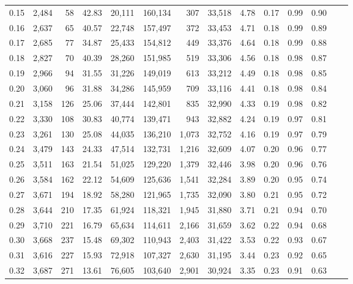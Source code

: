 \begin{tabular}{rrrrrrrrrrrrrr}
0.15 &  2,484 &   58 &   42.83 &   20,111 &  160,134 &     307 &  33,518 &  4.78 &  0.17 &  0.99 &      0.90 \\
0.16 &  2,637 &   65 &   40.57 &   22,748 &  157,497 &     372 &  33,453 &  4.71 &  0.18 &  0.99 &      0.89 \\
0.17 &  2,685 &   77 &   34.87 &   25,433 &  154,812 &     449 &  33,376 &  4.64 &  0.18 &  0.99 &      0.88 \\
0.18 &  2,827 &   70 &   40.39 &   28,260 &  151,985 &     519 &  33,306 &  4.56 &  0.18 &  0.98 &      0.87 \\
0.19 &  2,966 &   94 &   31.55 &   31,226 &  149,019 &     613 &  33,212 &  4.49 &  0.18 &  0.98 &      0.85 \\
0.20 &  3,060 &   96 &   31.88 &   34,286 &  145,959 &     709 &  33,116 &  4.41 &  0.18 &  0.98 &      0.84 \\
0.21 &  3,158 &  126 &   25.06 &   37,444 &  142,801 &     835 &  32,990 &  4.33 &  0.19 &  0.98 &      0.82 \\
0.22 &  3,330 &  108 &   30.83 &   40,774 &  139,471 &     943 &  32,882 &  4.24 &  0.19 &  0.97 &      0.81 \\
0.23 &  3,261 &  130 &   25.08 &   44,035 &  136,210 &   1,073 &  32,752 &  4.16 &  0.19 &  0.97 &      0.79 \\
0.24 &  3,479 &  143 &   24.33 &   47,514 &  132,731 &   1,216 &  32,609 &  4.07 &  0.20 &  0.96 &      0.77 \\
0.25 &  3,511 &  163 &   21.54 &   51,025 &  129,220 &   1,379 &  32,446 &  3.98 &  0.20 &  0.96 &      0.76 \\
0.26 &  3,584 &  162 &   22.12 &   54,609 &  125,636 &   1,541 &  32,284 &  3.89 &  0.20 &  0.95 &      0.74 \\
0.27 &  3,671 &  194 &   18.92 &   58,280 &  121,965 &   1,735 &  32,090 &  3.80 &  0.21 &  0.95 &      0.72 \\
0.28 &  3,644 &  210 &   17.35 &   61,924 &  118,321 &   1,945 &  31,880 &  3.71 &  0.21 &  0.94 &      0.70 \\
0.29 &  3,710 &  221 &   16.79 &   65,634 &  114,611 &   2,166 &  31,659 &  3.62 &  0.22 &  0.94 &      0.68 \\
0.30 &  3,668 &  237 &   15.48 &   69,302 &  110,943 &   2,403 &  31,422 &  3.53 &  0.22 &  0.93 &      0.67 \\
0.31 &  3,616 &  227 &   15.93 &   72,918 &  107,327 &   2,630 &  31,195 &  3.44 &  0.23 &  0.92 &      0.65 \\
0.32 &  3,687 &  271 &   13.61 &   76,605 &  103,640 &   2,901 &  30,924 &  3.35 &  0.23 &  0.91 &      0.63 \\

\end{tabular}
